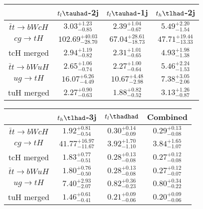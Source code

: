 \centering
\begin{tabular}{|c|c|c|c|} \hline
 & $t_l\tauhad$-2j & $t_l\tauhad$-1j & $t_h\tlhad$-2j\\\hline
$\bar{t}t\to bWcH$ & $3.03^{+1.23}_{-0.85}$ & $2.39^{+1.04}_{-0.67}$ & $5.49^{+2.20}_{-1.54}$\\\hline
$cg\to tH$ & $102.69^{+40.03}_{-28.70}$ & $67.04^{+28.61}_{-18.73}$ & $47.71^{+19.44}_{-13.33}$\\\hline
tcH merged & $2.94^{+1.19}_{-0.82}$ & $2.31^{+1.01}_{-0.65}$ & $4.93^{+1.98}_{-1.38}$\\\hline
$\bar{t}t\to bWuH$ & $2.65^{+1.06}_{-0.74}$ & $2.27^{+1.00}_{-0.64}$ & $5.46^{+2.24}_{-1.53}$\\\hline
$ug\to tH$ & $16.07^{+6.26}_{-4.49}$ & $10.67^{+4.48}_{-2.98}$ & $7.38^{+3.05}_{-2.06}$\\\hline
tuH merged & $2.27^{+0.90}_{-0.63}$ & $1.88^{+0.82}_{-0.52}$ & $3.13^{+1.26}_{-0.87}$\\\hline
\end{tabular}
\begin{tabular}{|c|c|c|c|} \hline
 & $t_h\tlhad$-3j & $t_l\thadhad$ & Combined\\\hline
$\bar{t}t\to bWcH$ & $1.92^{+0.81}_{-0.54}$ & $0.30^{+0.14}_{-0.09}$ & $0.29^{+0.13}_{-0.08}$\\\hline
$cg\to tH$ & $41.77^{+16.97}_{-11.67}$ & $3.92^{+1.70}_{-1.10}$ & $3.84^{+1.65}_{-1.07}$\\\hline
tcH merged & $1.83^{+0.77}_{-0.51}$ & $0.28^{+0.13}_{-0.08}$ & $0.27^{+0.12}_{-0.08}$\\\hline
$\bar{t}t\to bWuH$ & $1.80^{+0.76}_{-0.50}$ & $0.28^{+0.13}_{-0.08}$ & $0.27^{+0.12}_{-0.07}$\\\hline
$ug\to tH$ & $7.40^{+2.93}_{-2.07}$ & $0.82^{+0.36}_{-0.23}$ & $0.80^{+0.34}_{-0.22}$\\\hline
tuH merged & $1.46^{+0.61}_{-0.41}$ & $0.21^{+0.09}_{-0.06}$ & $0.20^{+0.09}_{-0.06}$\\\hline
\end{tabular}
